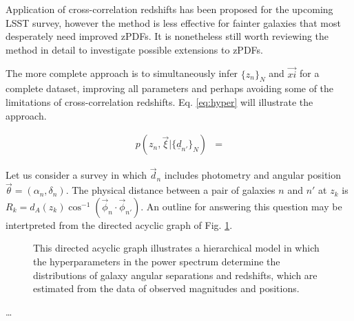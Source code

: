 \documentclass[12pt, onecolumn]{emulateapj}
\newcommand{\textul}{\underline}
\begin{document}
Application of cross-correlation redshifts has been proposed for the upcoming LSST survey, however the method is less effective for fainter galaxies that most desperately need improved zPDFs.  \citep{abe09}  It is nonetheless still worth reviewing the method in detail to investigate possible extensions to zPDFs.

The more complete approach is to simultaneously infer $\{z_{n}\}_{N}$ and $\vec{xi}$ for a complete dataset, improving all parameters and perhaps avoiding some of the limitations of cross-correlation redshifts.  Eq. \ref{eq:hyper} will illustrate the approach.

\begin{align}
\label{eq:hyper}
p(z_{n},\vec{\xi}|\{\textul{d}_{n'}\}_{N}) &= 
\end{align}

Let us consider a survey in which $\vec{d}_{n}$ includes photometry and angular position $\vec{\theta}=(\alpha_{n},\delta_{n})$.  The physical distance between a pair of galaxies $n$ and $n'$ at $z_{k}$ is $R_{k}=d_{A}(z_{k})\cos^{-1}(\vec{\phi}_{n}\cdot\vec{\phi}_{n'})$.  An outline for answering this question may be intertpreted from the directed acyclic graph of Fig. \ref{fig:flow}.

\begin{figure}
\label{fig:flow}
\vspace{0.5cm}
\begin{center}
\caption{This directed acyclic graph illustrates a hierarchical model in which the hyperparameters in the power spectrum determine the distributions of galaxy angular separations and redshifts, which are estimated from the data of observed magnitudes and positions.}
\end{center}
\end{figure}

\dots




\end{document}
